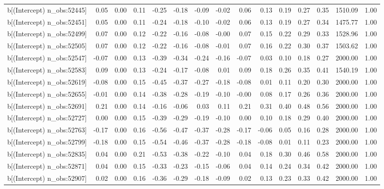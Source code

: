 \begin{table}[ht]
\begin{tabular}{rrrrrrrrrrrrrrr}
  b[(Intercept) n\_obs:52445] & 0.05 & 0.00 & 0.11 & -0.25 & -0.18 & -0.09 & -0.02 & 0.06 & 0.13 & 0.19 & 0.27 & 0.35 & 1510.09 & 1.00 \\ 
  b[(Intercept) n\_obs:52451] & 0.05 & 0.00 & 0.11 & -0.24 & -0.18 & -0.10 & -0.02 & 0.06 & 0.13 & 0.19 & 0.27 & 0.34 & 1475.77 & 1.00 \\ 
  b[(Intercept) n\_obs:52499] & 0.07 & 0.00 & 0.12 & -0.22 & -0.16 & -0.08 & -0.00 & 0.07 & 0.15 & 0.22 & 0.29 & 0.33 & 1528.96 & 1.00 \\ 
  b[(Intercept) n\_obs:52505] & 0.07 & 0.00 & 0.12 & -0.22 & -0.16 & -0.08 & -0.01 & 0.07 & 0.16 & 0.22 & 0.30 & 0.37 & 1503.62 & 1.00 \\ 
  b[(Intercept) n\_obs:52547] & -0.07 & 0.00 & 0.13 & -0.39 & -0.34 & -0.24 & -0.16 & -0.07 & 0.03 & 0.10 & 0.18 & 0.27 & 2000.00 & 1.00 \\ 
  b[(Intercept) n\_obs:52583] & 0.09 & 0.00 & 0.13 & -0.24 & -0.17 & -0.08 & 0.01 & 0.09 & 0.18 & 0.26 & 0.35 & 0.41 & 1540.19 & 1.00 \\ 
  b[(Intercept) n\_obs:52619] & -0.08 & 0.00 & 0.15 & -0.45 & -0.37 & -0.27 & -0.18 & -0.08 & 0.01 & 0.11 & 0.20 & 0.30 & 2000.00 & 1.00 \\ 
  b[(Intercept) n\_obs:52655] & -0.01 & 0.00 & 0.14 & -0.38 & -0.28 & -0.19 & -0.10 & -0.00 & 0.08 & 0.17 & 0.26 & 0.36 & 2000.00 & 1.00 \\ 
  b[(Intercept) n\_obs:52691] & 0.21 & 0.00 & 0.14 & -0.16 & -0.06 & 0.03 & 0.11 & 0.21 & 0.31 & 0.40 & 0.48 & 0.56 & 2000.00 & 1.00 \\ 
  b[(Intercept) n\_obs:52727] & 0.00 & 0.00 & 0.15 & -0.39 & -0.29 & -0.19 & -0.10 & 0.00 & 0.10 & 0.18 & 0.29 & 0.40 & 2000.00 & 1.00 \\ 
  b[(Intercept) n\_obs:52763] & -0.17 & 0.00 & 0.16 & -0.56 & -0.47 & -0.37 & -0.28 & -0.17 & -0.06 & 0.05 & 0.16 & 0.28 & 2000.00 & 1.00 \\ 
  b[(Intercept) n\_obs:52799] & -0.18 & 0.00 & 0.15 & -0.54 & -0.46 & -0.37 & -0.28 & -0.18 & -0.08 & 0.01 & 0.11 & 0.23 & 2000.00 & 1.00 \\ 
  b[(Intercept) n\_obs:52835] & 0.04 & 0.00 & 0.21 & -0.53 & -0.38 & -0.22 & -0.10 & 0.04 & 0.18 & 0.30 & 0.46 & 0.58 & 2000.00 & 1.00 \\ 
  b[(Intercept) n\_obs:52871] & 0.04 & 0.00 & 0.15 & -0.33 & -0.23 & -0.15 & -0.06 & 0.04 & 0.14 & 0.24 & 0.34 & 0.42 & 2000.00 & 1.00 \\ 
  b[(Intercept) n\_obs:52907] & 0.02 & 0.00 & 0.16 & -0.36 & -0.29 & -0.18 & -0.09 & 0.02 & 0.13 & 0.23 & 0.33 & 0.42 & 2000.00 & 1.00 \\ 

\end{tabular}
\end{table}

